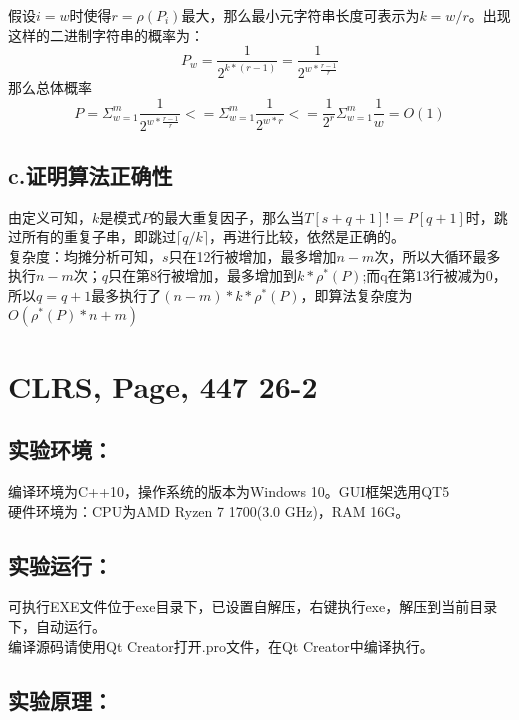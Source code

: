 \documentclass[UTF8]{ctexart}
\begin{document}
假设$i=w$时使得$r=\rho (P_i)$最大，那么最小元字符串长度可表示为$k=w/r$。出现这样的二进制字符串的概率为：
$$P_w=\frac{1}{2^{k*(r-1)}}=\frac{1}{2^{w*\frac{r-1}{r}}}$$
那么总体概率
$$P=\Sigma_{w=1}^{m}\frac{1}{2^{w*\frac{r-1}{r}}}<=\Sigma_{w=1}^{m}\frac{1}{2^{w*r}}<=\frac{1}{2^r}\Sigma_{w=1}^{m}\frac{1}{w}=O(1)$$

\subsection{c.证明算法正确性}

由定义可知，$k$是模式$P$的最大重复因子，那么当$T[s+q+1]!=P[q+1]$时，跳过所有的重复子串，即跳过$\lceil q/k\rceil$，再进行比较，依然是正确的。\\

复杂度：均摊分析可知，$s$只在12行被增加，最多增加$n-m$次，所以大循环最多执行$n-m$次；$q$只在第8行被增加，最多增加到$k*\rho^{*}(P)$;而q在第13行被减为0，所以$q=q+1$最多执行了$(n-m)*k*\rho^{*}(P)$，即算法复杂度为$O(\rho^{*}(P)*n+m)$


\section{CLRS, Page, 447 26-2}

\subsection{实验环境：}

编译环境为C++10，操作系统的版本为Windows 10。GUI框架选用QT5\\
硬件环境为：CPU为AMD Ryzen 7 1700(3.0 GHz)，RAM 16G。

\subsection{实验运行：}

可执行EXE文件位于exe目录下，已设置自解压，右键执行exe，解压到当前目录下，自动运行。\\

编译源码请使用Qt Creator打开.pro文件，在Qt Creator中编译执行。

\subsection{实验原理：}
\end{document}
